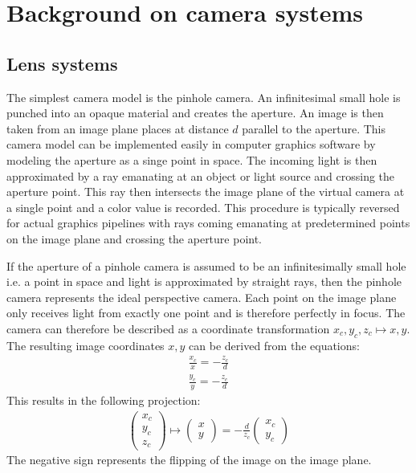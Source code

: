 \chapter{Background on camera systems}
\label{ch:background}

\section{Lens systems}
The simplest camera model is the pinhole camera.
An infinitesimal small hole is punched into an opaque material and creates the aperture.
An image is then taken from an image plane places at distance $d$ parallel to the aperture.
This camera model can be implemented easily in computer graphics software by modeling the aperture as a singe point in space.
The incoming light is then approximated by a ray emanating at an object or light source and crossing the aperture point.
This ray then intersects the image plane of the virtual camera at a single point and a color value is recorded.
This procedure is typically reversed for actual graphics pipelines with rays coming emanating at predetermined points on the image plane and crossing the aperture point.

If the aperture of a pinhole camera is assumed to be an infinitesimally small hole i.e. a point in space and light is approximated by straight rays, then the pinhole camera represents the ideal perspective camera.
Each point on the image plane only receives light from exactly one point and is therefore perfectly in focus.
The camera can therefore be described as a coordinate transformation $x_c, y_c, z_c \mapsto x, y$.
The resulting image coordinates $x, y$ can be derived from the equations:
\begin{align}
    \frac{x_c}{x} = -\frac{z_c}{d} \\
    \frac{y_c}{y} = -\frac{z_c}{d}
\end{align}
This results in the following projection:
\begin{align}
    \begin{pmatrix}
    x_c \\
    y_c \\
    z_c
\end{pmatrix} 
\mapsto
\begin{pmatrix}
    x \\
    y
\end{pmatrix}
= -\frac{d}{z_c}
\begin{pmatrix}
    x_c \\
    y_c
\end{pmatrix}
\end{align}
The negative sign represents the flipping of the image on the image plane.

